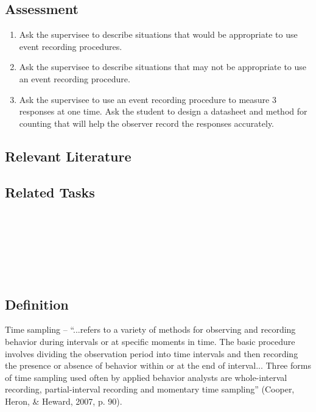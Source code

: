 \subsection{Assessment}
\begin{enumerate}
\item Ask the supervisee to describe situations that would be appropriate to use event recording procedures. 
\item Ask the supervisee to describe situations that may not be appropriate to use an event recording procedure.
\item Ask the supervisee to use an event recording procedure to measure 3 responses at one time. Ask the student to design a datasheet and method for counting that will help the observer record the responses accurately. 
\end{enumerate}
%
\subsection{Relevant Literature}
\begin{refsection}
\nocite{cooper2007applied,kelly1977review,sasso1992use}
\printbibliography[heading=none]
\end{refsection}
%
\subsection{Related Tasks} 
\fouraNine{}\\ 
\fourhOne{}\\
\fouriOne{}\\
\fourFKFourtySeven{}\\
\fourFKFourtyEight{}\\
%
%
%
%
\section[\fouraThirteen{}]{\fouraThirteen{}%
              }
\subsection{Definition}
Time sampling – ``...refers to a variety of methods for observing and recording behavior during intervals or at specific moments in time. The basic procedure involves dividing the observation period into time intervals and then recording the presence or absence of behavior within or at the end of interval... Three forms of time sampling used often by applied behavior analysts are whole-interval recording, partial-interval recording and momentary time sampling'' (Cooper, Heron, \& Heward, 2007, p. 90). 

